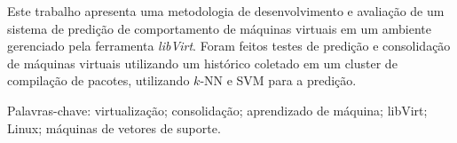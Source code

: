 \documentclass[font=plain,chapter=TITLE,section=Title,espaco=duplo,tocpage=plain,appendix=NAME,floatnumber=continuous]{abnt}
\begin{document}


\UTPCapa
\UTPFalsaFolhaDeRosto
\UTPFolhaDeRosto

\begin{resumo}
Este trabalho apresenta uma metodologia de desenvolvimento e avaliação de
um sistema de predição de comportamento de máquinas virtuais em um ambiente
gerenciado pela ferramenta \emph{libVirt}. Foram feitos testes de predição e
consolidação de máquinas virtuais utilizando um histórico coletado em um
cluster de compilação de pacotes, utilizando $k$-NN e SVM para a predição.

Palavras-chave: virtualização; consolidação; aprendizado de máquina;
libVirt; Linux; máquinas de vetores de suporte.
\end{resumo}

\listoffigures
\listadequadros
\sumario




















\end{document}
